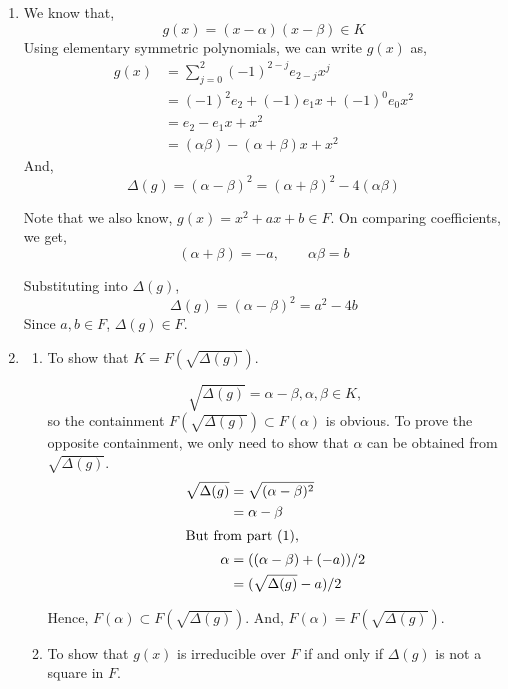 \documentclass[12pt]{article}
\begin{document}
\begin{solution}
    \bbni

    \begin{enumerate}
        \item We know that, 
        \[g(x) = (x - \alpha) (x -\beta) \in K\]
        Using elementary symmetric polynomials, we can write $g(x)$ as, 
        \begin{align*}
            g(x) &= \sum_{j=0}^{2}(-1)^{2-j}e_{2-j}x^j \\ 
            &= (-1)^2e_2 + (-1)e_1x + (-1)^0e_0x^2 \\ 
            &= e_2 - e_1x + x^2 \\ 
            &= (\alpha\beta) - (\alpha + \beta)x + x^2 
        \end{align*}
        And,
        \[\Delta(g) = (\alpha - \beta)^2 = (\alpha + \beta)^2 - 4(\alpha\beta)\]

        Note that we also know, 
        $g(x) = x^2 + ax + b \in F$. On comparing coefficients, we get, 
        \[(\alpha + \beta) = -a, \qquad \alpha\beta = b\]

        Substituting into $\Delta(g)$, 
        \[\Delta(g) = (\alpha - \beta)^2 = a^2 - 4b\]
        Since $a,b \in F$, $\Delta(g) \in F$. 

        \item \begin{enumerate}

        \item To show that $K = F(\sqrt{\Delta(g)})$. 

        
        \[\sqrt{\Delta(g)} = \alpha - \beta, \alpha, \beta \in K,\] so the containment  $F(\sqrt{\Delta(g)}) \subset F(\alpha)$ is obvious. To prove the opposite containment, we only need to show that $\alpha$ can be obtained from $\sqrt{\Delta(g)}$. 
        \begin{align*}
            \sqrt{\Delta(g)} &= \sqrt{(\alpha - \beta)^2} \\ 
            &= \alpha - \beta \\ 
            \intertext{But from part (1),} 
            \alpha &=  ((\alpha - \beta) + (-a))/2 \\
            &= (\sqrt{\Delta(g)} - a) / 2
        \end{align*} 

        Hence, $F(\alpha) \subset F(\sqrt{\Delta(g)})$. And, $F(\alpha) = F(\sqrt{\Delta(g)})$. 

        
        \item To show that $g(x)$ is irreducible over $F$ if and only if $\Delta(g)$ is not a square in $F$. 


\end{enumerate}
\end{enumerate}
\end{solution}
\end{document}
